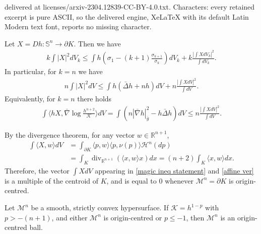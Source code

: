 \documentclass[10pt,a4paper]{amsart}
\newcommand{\M}{\mathcal{M}}
\newcommand{\Rn}{\mathbb{R}^{n+1}}
\newcommand{\Sn}{\mathbb{S}^n}
\begin{document}
delivered at licenses/arxiv-2304.12839-CC-BY-4.0.txt. Characters: every retained excerpt is pure ASCII, so the delivered engine, XeLaTeX with its default Latin Modern text font, reports no missing character.
\begin{lemma}\label{magic inequality}
Let $X=Dh: \Sn\to \partial K$. Then we have
\begin{align*}
k\int |X|^2 dV_k\leq \int h \left ( \sigma_1-(k+1)\frac{\sigma_{k+1}}{\sigma_k} \right )dV_k +k\frac{|\int X dV_k|^2}{\int dV_k}.
\end{align*}
In particular, for $k=n$ we have
\begin{align}\label{magic ineq statement}
n\int|X|^2dV\leq \int h (\bar{\Delta}h+nh)dV+n\frac{\left|\int X dV\right|^2}{\int dV} .
\end{align}
Equivalently, for $k=n$ there holds
\begin{align}\label{affine ver}
\int \langle hX, \bar{\nabla}\log \frac{h^{n+2}}{\mathcal{K}} \rangle dV = \int (n|\bar\nabla h|_{\bar g}^2 - h \bar \Delta h) dV \leq n\frac{|\int XdV|^2}{\int dV}.
\end{align}
\end{lemma}

\begin{remark}\label{centroid}
By the divergence theorem, for any vector $w \in \mathbb{R}^{n+1}$,
\begin{align*}
\int \langle X,w\rangle dV & =\int_{\partial K} \langle p,w\rangle\langle p,\nu(p)\rangle \mathcal{H}^n(dp) \\
& =\int_{K} \operatorname{div}_{\Rn}(\langle x,w\rangle x ) dx =(n+2)\int_K \langle x,w\rangle dx.
\end{align*}
Therefore, the vector $\int XdV$ appearing in \eqref{magic ineq statement} and \eqref{affine ver} is a multiple of the centroid of $K$, and is equal to $0$ whenever $\M^n = \partial K$ is origin-centred. 
\end{remark}

\begin{theorem} \label{thm:BCD}
Let $\M^n$ be a smooth, strictly convex hypersurface. If $\mathcal{K}=h^{1-p}$ with $p > -(n+1)$, and either $\M^n$ is origin-centred or $p \leq -1$, then $\M^n$ is an origin-centred ball. 
\end{theorem}
\end{document}
